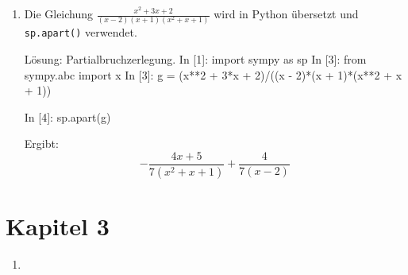 \begin{enumerate}
\item Die Gleichung $ \frac{x^{2} + 3 x + 2}{\left(x - 2\right) \left(x + 1\right) \left(x^{2} + x + 1\right)}$ wird in Python übersetzt und \texttt{sp.apart()} verwendet.
\begin{python}{Lösung: Partialbruchzerlegung.}
In [1]: import sympy as sp
In [3]: from sympy.abc import x
In [3]: g = (x**2 + 3*x + 2)/((x - 2)*(x + 1)*(x**2 + x + 1))

In [4]: sp.apart(g)
\end{python}

Ergibt:
$$- \frac{4 x + 5}{7 \left(x^{2} + x + 1\right)} + \frac{4}{7 \left(x - 2\right)}$$


\end{enumerate}

\section{Kapitel 3}
\begin{enumerate}
\item
\end{enumerate}

